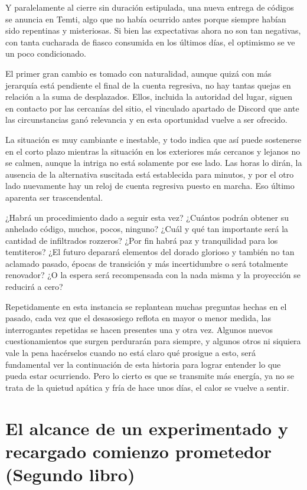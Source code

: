 \documentclass[
]{book}
\begin{document}
Y paralelamente al cierre sin duración estipulada, una nueva entrega de códigos se anuncia en Temti, algo que no había ocurrido antes porque siempre habían sido repentinas y misteriosas. Si bien las expectativas ahora no son tan negativas, con tanta cucharada de fiasco consumida en los últimos días, el optimismo se ve un poco condicionado.

El primer gran cambio es tomado con naturalidad, aunque quizá con más jerarquía está pendiente el final de la cuenta regresiva, no hay tantas quejas en relación a la suma de desplazados. Ellos, incluida la autoridad del lugar, siguen en contacto por las cercanías del sitio, el vinculado apartado de Discord que ante las circunstancias ganó relevancia y en esta oportunidad vuelve a ser ofrecido.

La situación es muy cambiante e inestable, y todo indica que así puede sostenerse en el corto plazo mientras la situación en los exteriores más cercanos y lejanos no se calmen, aunque la intriga no está solamente por ese lado. Las horas lo dirán, la ausencia de la alternativa suscitada está establecida para minutos, y por el otro lado nuevamente hay un reloj de cuenta regresiva puesto en marcha. Eso último aparenta ser trascendental.

¿Habrá un procedimiento dado a seguir esta vez? ¿Cuántos podrán obtener su anhelado código, muchos, pocos, ninguno? ¿Cuál y qué tan importante será la cantidad de infiltrados rozzeros? ¿Por fin habrá paz y tranquilidad para los temtiteros? ¿El futuro deparará elementos del dorado glorioso y también no tan aclamado pasado, épocas de transición y más incertidumbre o será totalmente renovador? ¿O la espera será recompensada con la nada misma y la proyección se reducirá a cero?

Repetidamente en esta instancia se replantean muchas preguntas hechas en el pasado, cada vez que el desasosiego reflota en mayor o menor medida, las interrogantes repetidas se hacen presentes una y otra vez. Algunos nuevos cuestionamientos que surgen perdurarán para siempre, y algunos otros ni siquiera vale la pena hacérselos cuando no está claro qué prosigue a esto, será fundamental ver la continuación de esta historia para lograr entender lo que pueda estar ocurriendo. Pero lo cierto es que se transmite más energía, ya no se trata de la quietud apática y fría de hace unos días, el calor se vuelve a sentir.

\hypertarget{el-alcance-de-un-experimentado-y-recargado-comienzo-prometedor-segundo-libro}{%
\chapter{El alcance de un experimentado y recargado comienzo prometedor (Segundo libro)}\label{el-alcance-de-un-experimentado-y-recargado-comienzo-prometedor-segundo-libro}}
\end{document}

